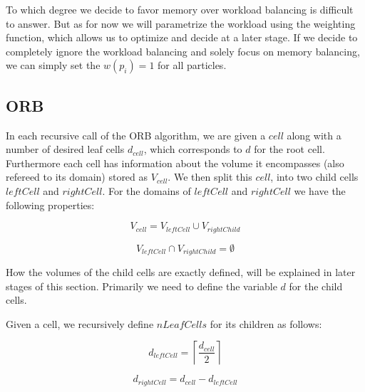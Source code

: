 \documentclass[]{article}
\begin{document}
To which degree we decide to favor memory over workload balancing is difficult to answer. But as for now we will parametrize the workload using the weighting function, which allows us to optimize and decide at a later stage. If we decide to completely ignore the workload balancing and solely focus on memory balancing, we can simply set the $w(p_i) = 1$ for all particles.


\subsection{ORB}


In each recursive call of the ORB algorithm, we are given a $cell$ along with a number of desired leaf cells $d_{cell}$, which corresponds to $d$ for the root cell. Furthermore each cell has information about the volume it encompasses (also refereed to its domain) stored as $V_{cell}$. We then split this $cell$, into two child cells $leftCell$ and $rightCell$. For the domains of $leftCell$ and $rightCell$ we have the following properties: 

\begin{center}
	\begin{equation}
		V_{cell} = V_{leftCell} \cup V_{rightChild}
	\end{equation}
\end{center}

\begin{center}
	\begin{equation}
		V_{leftCell} \cap V_{rightChild} = \emptyset
	\end{equation}
\end{center}

How the volumes of the child cells are exactly defined, will be explained in later stages of this section. Primarily we need to define the variable $d$ for the child cells.

Given a cell, we recursively define $nLeafCells$ for its children as follows:

\begin{center}
	\begin{equation}
		d_{leftCell} = \left \lceil\frac{d_{cell}}{2} \right \rceil 
	\end{equation}
\end{center}

\begin{center}
	\begin{equation}
		d_{rightCell} = d_{cell} - d_{leftCell}
	\end{equation}
\end{center}
\end{document}
